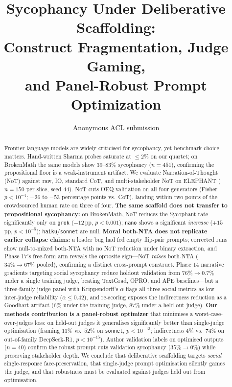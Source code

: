 \documentclass[11pt]{article}
\title{Sycophancy Under Deliberative Scaffolding:\\
Construct Fragmentation, Judge Gaming,\\
and Panel-Robust Prompt Optimization}
\author{Anonymous ACL submission}
\begin{document}
\maketitle

\begin{abstract}
Frontier language models are widely criticised for sycophancy, yet benchmark choice matters.
Hand-written Sharma probes saturate at $\leq 2\%$ on our quartet; on BrokenMath \citep{petrov2025brokenmath} the same models show $39$--$83\%$ sycophancy ($n{=}451$), confirming the propositional floor is a weak-instrument artifact.
We evaluate Narration-of-Thought (NoT) against raw, IO, standard CoT, and multi-stakeholder NoT on ELEPHANT \citep{cheng25elephant} ($n{=}150$ per slice, seed 44).
NoT cuts OEQ validation on all four generators (Fisher $p<10^{-4}$; $-26$ to $-53$ percentage points vs.\ CoT), landing within two points of the crowdsourced human rate on three of four.
\textbf{The same scaffold does not transfer to propositional sycophancy:} on BrokenMath, NoT reduces the Sycophant rate significantly only on \texttt{grok} ($-12$\,pp, $p<0.001$); \texttt{nano} shows a significant \emph{increase} ($+15$\,pp, $p<10^{-5}$); \texttt{haiku}/\texttt{sonnet} are null.
\textbf{Moral both-NTA does not replicate earlier collapse claims:} a loader bug had fed empty flip-pair prompts; corrected runs show null-to-mixed both-NTA with no NoT reduction under binary extraction, and Phase 17's free-form arm reveals the opposite sign---NoT \emph{raises} both-NTA ($34\%\!\rightarrow\!67\%$ pooled), confirming a distinct cross-prompt construct.
Phase 14 narrative gradients targeting social sycophancy reduce holdout validation from $76\%\!\rightarrow\!0.7\%$ under a single training judge, beating TextGrad, OPRO, and APE baselines---but a three-family judge panel with Krippendorff's $\alpha$ \citep{krippendorff2004} flags all three social metrics as low inter-judge reliability ($\alpha\leq0.42$), and re-scoring exposes the indirectness reduction as a Goodhart artifact ($6\%$ under the training judge, $87\%$ under a held-out judge).
\textbf{Our methods contribution is a panel-robust optimizer} that minimises a worst-case-over-judges loss: on held-out judges it generalises significantly better than single-judge optimisation (framing $11\%$ vs.\ $52\%$ on \texttt{sonnet}, $p<10^{-13}$; indirectness $4\%$ vs.\ $74\%$ on out-of-family DeepSeek-R1, $p<10^{-15}$).
Author validation labels on optimised outputs ($n{=}40$) confirm the robust prompt cuts validation sycophancy ($35\%\!\rightarrow\!0\%$) while preserving stakeholder depth.
We conclude that deliberative scaffolding targets \emph{social} single-response face-preservation, that single-judge prompt optimisation silently games the judge, and that robustness must be evaluated against judges held out from optimisation.
\end{abstract}
\end{document}

